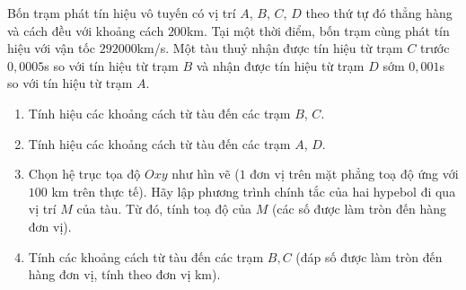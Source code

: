 \begin{vd}%
 Bốn trạm phát tín hiệu vô tuyến có vị trí $A$, $B$, $C$, $D$ theo thứ tự đó thẳng hàng và cách đều với khoảng cách $200$km. Tại một thời điểm, bốn trạm cùng phát tín hiệu với vận tốc $292000$km/s. Một tàu thuỷ nhận được tín hiệu từ trạm $C$ trước $0{,}0005$s so với tín hiệu từ trạm $B$ và nhận được tín hiệu từ trạm $D$ sớm $0{,}001$s so với tín hiệu từ trạm $A$.   
 \begin{center}
 \end{center}
    \begin{enumerate}
        \item Tính hiệu các khoảng cách từ tàu đến các trạm $B$, $C$.
        \item Tính hiệu các khoảng cách từ tàu đến các trạm $A$, $D$.
        \item Chọn hệ trục tọa độ $Oxy$ như hìn vẽ ($1$ đơn vị trên mặt phẳng toạ độ ứng với $100$ km trên thực tế). Hãy lập phương trình chính tắc của hai hypebol đi qua vị trí $M$ của tàu. Từ đó, tính toạ độ của $M$ (các số được làm tròn đến hàng đơn vị).
        \item Tính các khoảng cách từ tàu đến các trạm $B, C$ (đáp số được làm tròn đến hàng đơn vị, tính theo đơn vị km).
    \end{enumerate}


\end{vd}
